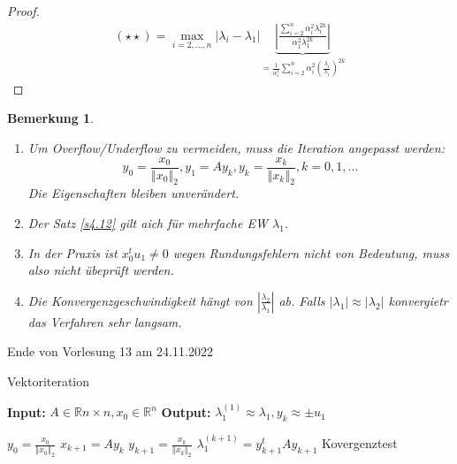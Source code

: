 \documentclass{book}
\newtheorem{remark}[algorithm]{Bemerkung}
\def\R{\mathbb{R}}
\begin{document}
\begin{proof}
                \begin{align*}
                    (\star\star) = \max_{i=2,\dots,n}\left\vert \lambda_i-\lambda_1 \right\vert \underbrace{\left\vert \frac{\sum_{i=2}^n\alpha_i^2\lambda_i^{2k}}{\alpha_1^2\lambda_1^{2k}} \right\vert}_{=\frac{1}{\alpha_1^2}\sum_{i=2}^n \alpha_i^2 \left(\frac{\lambda_i}{\lambda_1}\right)^{2k}} %
                \end{align*}

            \end{proof}

            \begin{remark}\label{4.13}
                \begin{enumerate}
                    \item Um Overflow/Underflow zu vermeiden, muss die Iteration angepasst werden:
                        \[y_0=\frac{x_0}{\left\Vert x_0 \right\Vert_2},y_1=Ay_k,y_k=\frac{x_k}{\left\Vert x_k \right\Vert_2}, k=0,1,\dots \]
                        Die Eigenschaften bleiben unverändert.
                    \item Der Satz \ref{s4.12} gilt aich für mehrfache EW $\lambda_1$.
                    \item In der Praxis ist $x_0^tu_1\neq 0$ wegen Rundungsfehlern nicht von Bedeutung, muss also nicht übeprüft werden.
                    \item Die Konvergenzgeschwindigkeit hängt von $\left\vert \frac{\lambda_2}{\lambda_1} \right\vert$ ab. Falls $ \vert \lambda_1 \vert \approx \vert \lambda_2 \vert $ konvergietr das Verfahren sehr langsam.    
                \end{enumerate}
            \end{remark}



            \noindent
            \xrfill[0.7ex]{1pt}Ende von Vorlesung 13 am 24.11.2022\xrfill[0.7ex]{1pt}
            
            \begin{algorithm}[H]
                     \caption{Vektoriteration}\label{a4.14}
                  \textbf{Input:} $A\in\R{n\times n,x_0\in\R^n}$ 
                  \textbf{Output:} $\lambda_1^{(1)}\approx \lambda_1,y_k\approx \pm u_1$
                  \begin{algorithmic}
                    \State $y_0=\frac{x_0}{\left\Vert x_0 \right\Vert_2}$
                        \State $x_{k+1}=Ay_k$
                        \State $y_{k+1}=\frac{x_k}{\left\Vert x_k \right\Vert_2}$
                        \State $\lambda_{1}^{(k+1)}=y_{k+1} ^t Ay_{k+1}$
                        \State Kovergenztest
                    \EndFor
                  \end{algorithmic}
               \end{algorithm}
                        
\end{document}
